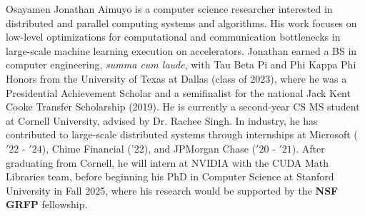 \begin{biosketch}
Osayamen Jonathan Aimuyo is a computer science researcher interested in distributed and parallel computing systems
and algorithms.
His work focuses on low-level optimizations for computational and communication bottlenecks in
large-scale machine learning execution on accelerators.
Jonathan earned a BS in computer engineering, \textit{summa cum laude}, with Tau Beta Pi and Phi Kappa Phi Honors from the
University of Texas at Dallas (class of 2023),
where he was a Presidential Achievement Scholar and a semifinalist
for the national Jack Kent Cooke Transfer Scholarship (2019).
He is currently a second-year CS MS student at Cornell University,
advised by Dr. Rachee Singh.
In industry, he has contributed to large-scale distributed systems through internships at
Microsoft (\('22\) - \('24\)), Chime Financial ('22), and JPMorgan Chase (\('20\) - \('21\)).
After graduating from Cornell, he will intern at NVIDIA with the CUDA Math Libraries team,
before beginning his PhD in Computer Science at Stanford University in Fall 2025, where his research
would be supported by the \textbf{NSF GRFP} fellowship.
\end{biosketch}